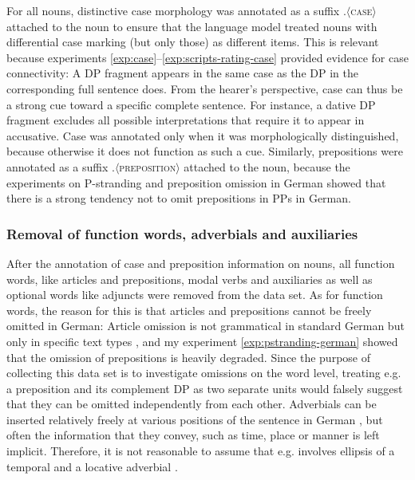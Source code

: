 For all nouns, distinctive case morphology was annotated as a suffix $.\langle$\textsc{case}$\rangle$ attached to the noun to ensure that the language model treated nouns with differential case marking (but only those) as different items. This is relevant because experiments \ref{exp:case}--\ref{exp:scripts-rating-case} provided evidence for case connectivity: A DP fragment appears in the same case as the DP in the corresponding full sentence does. From the hearer's perspective, case can thus be a strong cue toward a specific complete sentence. For instance, a dative DP fragment excludes all possible interpretations that require it to appear in accusative. Case was annotated only when it was morphologically distinguished, because otherwise it does not function as such a cue. Similarly, prepositions were annotated as a suffix $.\langle$\textsc{preposition}$\rangle$ attached to the noun, because the experiments on P-stranding and preposition omission in German showed that there is a strong tendency not to omit prepositions in PPs in German.

\subsubsection{Removal of function words, adverbials and auxiliaries}

After the annotation of case and preposition information on nouns, all function words, like articles and prepositions, modal verbs and auxiliaries as well as optional words like adjuncts were removed from the data set. As for function words, the reason for this is that articles and prepositions cannot be freely omitted in German: Article omission is not grammatical in standard German but only in specific text types \citep{reich2011, reich2017}, and my experiment \ref{exp:pstranding-german} showed that the omission of prepositions is heavily degraded. Since the purpose of collecting this data set is to investigate omissions on the word level, treating e.g. a preposition and its complement DP as two separate units would falsely suggest that they can be omitted independently from each other. Adverbials can be inserted relatively freely at various positions of the sentence in German \citep[209]{eisenberg1999}, but often the information that they convey, such as time, place or manner is left implicit. Therefore, it is not reasonable to assume that e.g. \Next involves ellipsis of a temporal and a locative adverbial \citep[1850]{reich2011}. 

